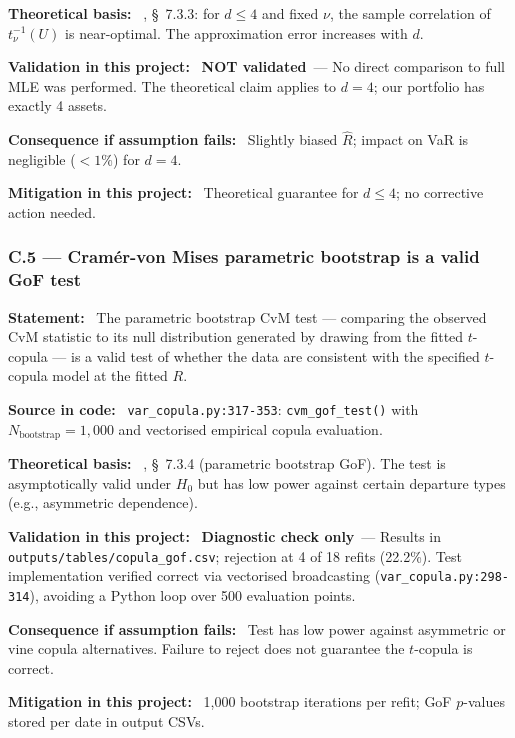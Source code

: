 \documentclass[11pt,a4paper]{article}
\newcommand{\asmfield}[1]{\medskip\noindent\textbf{#1:}\ }
\newcommand{\code}[1]{\texttt{#1}}
\newcommand{\diagnostic}{\textbf{Diagnostic check only}}
\newcommand{\notvalidated}{\textbf{NOT validated}}
\begin{document}
\asmfield{Theoretical basis}
\cite{McNeilFreyEmbrechts2005}, \S~7.3.3: for $d \le 4$ and fixed $\nu$,
the sample correlation of $t^{-1}_\nu(U)$ is near-optimal. The approximation
error increases with $d$.

\asmfield{Validation in this project}
\notvalidated\ --- No direct comparison to full MLE was performed. The
theoretical claim applies to $d = 4$; our portfolio has exactly 4 assets.

\asmfield{Consequence if assumption fails}
Slightly biased $\hat{R}$; impact on VaR is negligible ($< 1\%$) for $d = 4$.

\asmfield{Mitigation in this project}
Theoretical guarantee for $d \le 4$; no corrective action needed.

\subsubsection{C.5 --- Cram\'er-von Mises parametric bootstrap is a valid GoF test}\label{asm:C5}

\asmfield{Statement}
The parametric bootstrap CvM test --- comparing the observed CvM statistic
to its null distribution generated by drawing from the fitted $t$-copula ---
is a valid test of whether the data are consistent with the specified
$t$-copula model at the fitted $R$.

\asmfield{Source in code}
\code{var\_copula.py:317-353}: \code{cvm\_gof\_test()} with
$N_{\mathrm{bootstrap}} = 1{,}000$ and vectorised empirical copula evaluation.

\asmfield{Theoretical basis}
\cite{McNeilFreyEmbrechts2005}, \S~7.3.4 (parametric bootstrap GoF).
The test is asymptotically valid under $H_0$ but has low power against
certain departure types (e.g., asymmetric dependence).

\asmfield{Validation in this project}
\diagnostic\ --- Results in \code{outputs/tables/copula\_gof.csv};
rejection at 4 of 18 refits (22.2\%). Test implementation verified correct
via vectorised broadcasting (\code{var\_copula.py:298-314}), avoiding a
Python loop over 500 evaluation points.

\asmfield{Consequence if assumption fails}
Test has low power against asymmetric or vine copula alternatives. Failure
to reject does not guarantee the $t$-copula is correct.

\asmfield{Mitigation in this project}
1{,}000 bootstrap iterations per refit; GoF $p$-values stored per date
in output CSVs.
\end{document}
